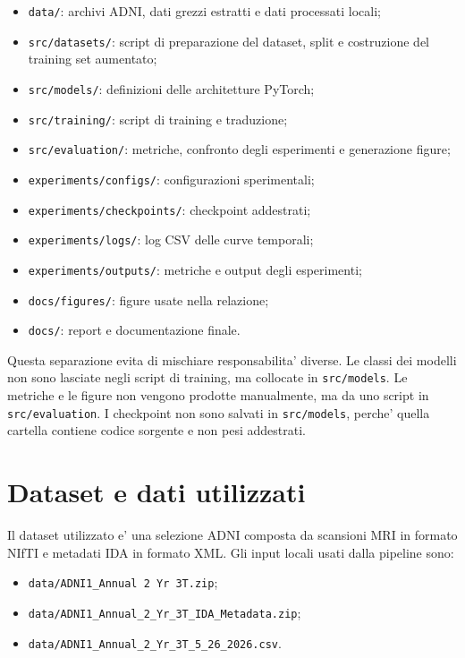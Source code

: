 \documentclass[12pt,a4paper]{article}
\begin{document}
\begin{itemize}[leftmargin=1.2cm]
    \item \texttt{data/}: archivi ADNI, dati grezzi estratti e dati processati locali;
    \item \texttt{src/datasets/}: script di preparazione del dataset, split e costruzione del training set aumentato;
    \item \texttt{src/models/}: definizioni delle architetture PyTorch;
    \item \texttt{src/training/}: script di training e traduzione;
    \item \texttt{src/evaluation/}: metriche, confronto degli esperimenti e generazione figure;
    \item \texttt{experiments/configs/}: configurazioni sperimentali;
    \item \texttt{experiments/checkpoints/}: checkpoint addestrati;
    \item \texttt{experiments/logs/}: log CSV delle curve temporali;
    \item \texttt{experiments/outputs/}: metriche e output degli esperimenti;
    \item \texttt{docs/figures/}: figure usate nella relazione;
    \item \texttt{docs/}: report e documentazione finale.
\end{itemize}

Questa separazione evita di mischiare responsabilita' diverse. Le classi dei modelli non sono lasciate negli script di training, ma collocate in \texttt{src/models}. Le metriche e le figure non vengono prodotte manualmente, ma da uno script in \texttt{src/evaluation}. I checkpoint non sono salvati in \texttt{src/models}, perche' quella cartella contiene codice sorgente e non pesi addestrati.

\section{Dataset e dati utilizzati}

Il dataset utilizzato e' una selezione ADNI composta da scansioni MRI in formato NIfTI e metadati IDA in formato XML. Gli input locali usati dalla pipeline sono:

\begin{itemize}[leftmargin=1.2cm]
    \item \texttt{data/ADNI1\_Annual 2 Yr 3T.zip};
    \item \texttt{data/ADNI1\_Annual\_2\_Yr\_3T\_IDA\_Metadata.zip};
    \item \texttt{data/ADNI1\_Annual\_2\_Yr\_3T\_5\_26\_2026.csv}.
\end{itemize}
\end{document}
